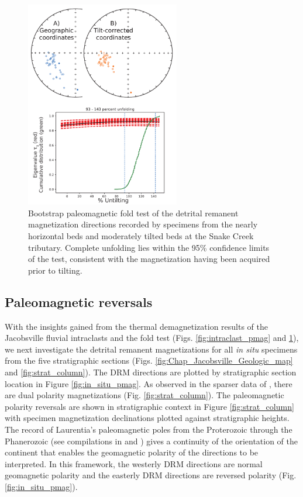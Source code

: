\begin{figure}
\centering
\includegraphics[width=0.6\textwidth]{figure/Zhang2024a/SC1_fold_test.pdf}
\caption{Bootstrap paleomagnetic fold test \citep{Tauxe1994a} of the detrital remanent magnetization directions recorded by specimens from the nearly horizontal beds and moderately tilted beds at the Snake Creek tributary. Complete unfolding lies within the 95\% confidence limits of the test, consistent with the magnetization having been acquired prior to tilting.}
\label{fig:fold_test}
\end{figure}

\subsection*{Paleomagnetic reversals}

With the insights gained from the thermal demagnetization results of the Jacobsville fluvial intraclasts and the fold test (Figs. \ref{fig:intraclast_pmag} and \ref{fig:fold_test}), we next investigate the detrital remanent magnetizations for all \textit{in situ} specimens from the five stratigraphic sections (Figs. \ref{fig:Chap_Jacobsville_Geologic_map} and \ref{fig:strat_column}). The DRM directions are plotted by stratigraphic section location in Figure \ref{fig:in_situ_pmag}. As observed in the sparser data of \cite{Roy1978a}, there are dual polarity magnetizations (Fig. \ref{fig:strat_column}). The paleomagnetic polarity reversals are shown in stratigraphic context in Figure \ref{fig:strat_column} with specimen magnetization declinations plotted against stratigraphic heights. The record of Laurentia's paleomagnetic poles from the Proterozoic through the Phanerozoic (see compilations in \cite{Torsvik2012a} and \cite{Swanson-Hysell2021c}) gives a continuity of the orientation of the continent that enables the geomagnetic polarity of the directions to be interpreted. In this framework, the westerly DRM directions are normal geomagnetic polarity and the easterly DRM directions are reversed polarity (Fig. \ref{fig:in_situ_pmag}). 

